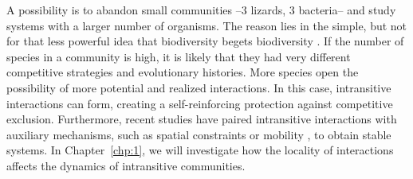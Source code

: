 A possibility is to abandon small communities --3 lizards, 3 bacteria-- and study systems with a larger number of organisms. The reason lies in the simple, but not for that less powerful idea that biodiversity begets biodiversity \cite{maynard2017diversity}. If the number of species in a community is high, it is likely that they had very different competitive strategies and evolutionary histories. More species open the possibility of more potential and realized interactions. In this case, intransitive interactions can form, creating a self-reinforcing protection against competitive exclusion. Furthermore, recent studies have paired intransitive interactions with auxiliary mechanisms, such as spatial constraints \cite{Laird2015} or mobility \cite{reichenbach2007mobility}, to obtain stable systems. In Chapter~\ref{chp:1}, we will investigate how the locality of interactions affects the dynamics of intransitive communities.\\



